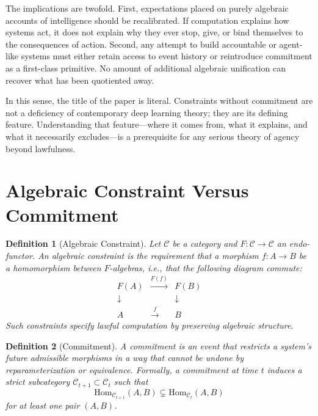 \documentclass[11pt]{article}
\newtheorem{definition}{Definition}
\begin{document}
The implications are twofold. First, expectations placed on purely algebraic
accounts of intelligence should be recalibrated. If computation explains how
systems act, it does not explain why they ever stop, give, or bind themselves to
the consequences of action. Second, any attempt to build accountable or
agent-like systems must either retain access to event history or reintroduce
commitment as a first-class primitive. No amount of additional algebraic
unification can recover what has been quotiented away.

In this sense, the title of the paper is literal. Constraints without commitment
are not a deficiency of contemporary deep learning theory; they are its defining
feature. Understanding that feature—where it comes from, what it explains, and
what it necessarily excludes—is a prerequisite for any serious theory of agency
beyond lawfulness.


\newpage
\appendix
\section{Algebraic Constraint Versus Commitment}

\begin{definition}[Algebraic Constraint]
Let $\mathcal{C}$ be a category and $F : \mathcal{C} \to \mathcal{C}$ an
endo-functor. An \emph{algebraic constraint} is the requirement that a morphism
$f : A \to B$ be a homomorphism between $F$-algebras, i.e., that the following
diagram commute:
\[
\begin{array}{ccc}
F(A) & \xrightarrow{F(f)} & F(B) \\
\downarrow & & \downarrow \\
A & \xrightarrow{f} & B
\end{array}
\]
Such constraints specify lawful computation by preserving algebraic structure.
\end{definition}

\begin{definition}[Commitment]
A \emph{commitment} is an event that restricts a system’s future admissible
morphisms in a way that cannot be undone by reparameterization or equivalence.
Formally, a commitment at time $t$ induces a strict subcategory
$\mathcal{C}_{t+1} \subset \mathcal{C}_t$ such that
\[
\mathrm{Hom}_{\mathcal{C}_{t+1}}(A,B) \subsetneq \mathrm{Hom}_{\mathcal{C}_t}(A,B)
\]
for at least one pair $(A,B)$.
\end{definition}
\end{document}
